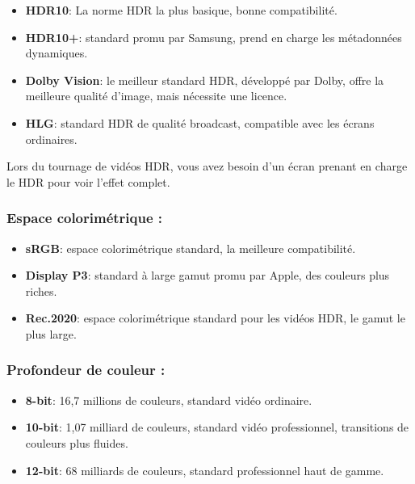 \begin{itemize}
  \item \textbf{HDR10}: La norme HDR la plus basique, bonne compatibilité.
  \item \textbf{HDR10+}: standard promu par Samsung, prend en charge les métadonnées dynamiques.
  \item \textbf{Dolby Vision}: le meilleur standard HDR, développé par Dolby, offre la meilleure qualité d'image, mais nécessite une licence.
  \item \textbf{HLG}: standard HDR de qualité broadcast, compatible avec les écrans ordinaires.
\end{itemize}

Lors du tournage de vidéos HDR, vous avez besoin d'un écran prenant en charge le HDR pour voir l'effet complet.


\subsubsection*{Espace colorimétrique :}

\begin{itemize}
  \item \textbf{sRGB}: espace colorimétrique standard, la meilleure compatibilité.
  \item \textbf{Display P3}: standard à large gamut promu par Apple, des couleurs plus riches.
  \item \textbf{Rec.2020}: espace colorimétrique standard pour les vidéos HDR, le gamut le plus large.
\end{itemize}

\subsubsection*{Profondeur de couleur :}

\begin{itemize}
  \item \textbf{8-bit}: 16,7 millions de couleurs, standard vidéo ordinaire.
  \item \textbf{10-bit}: 1,07 milliard de couleurs, standard vidéo professionnel, transitions de couleurs plus fluides.
  \item \textbf{12-bit}: 68 milliards de couleurs, standard professionnel haut de gamme.
\end{itemize}

